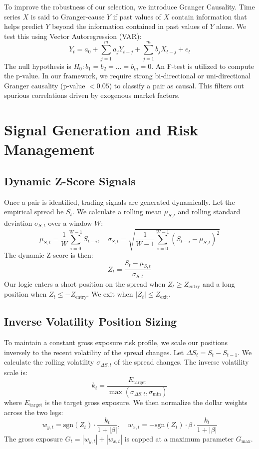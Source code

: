 \documentclass[12pt,a4paper]{article}
\begin{document}
To improve the robustness of our selection, we introduce Granger Causality. Time series $X$ is said to Granger-cause $Y$ if past values of $X$ contain information that helps predict $Y$ beyond the information contained in past values of $Y$ alone. We test this using Vector Autoregression (VAR):
\begin{equation}
    Y_t = a_0 + \sum_{j=1}^m a_j Y_{t-j} + \sum_{j=1}^m b_j X_{t-j} + e_t
\end{equation}
The null hypothesis is $H_0: b_1 = b_2 = \dots = b_m = 0$. An F-test is utilized to compute the p-value. In our framework, we require strong bi-directional or uni-directional Granger causality (p-value $< 0.05$) to classify a pair as causal. This filters out spurious correlations driven by exogenous market factors.

\section{Signal Generation and Risk Management}

\subsection{Dynamic Z-Score Signals}
Once a pair is identified, trading signals are generated dynamically. Let the empirical spread be $S_t$. We calculate a rolling mean $\mu_{S,t}$ and rolling standard deviation $\sigma_{S,t}$ over a window $W$:
\begin{equation}
    \mu_{S,t} = \frac{1}{W} \sum_{i=0}^{W-1} S_{t-i}, \quad \sigma_{S,t} = \sqrt{\frac{1}{W-1} \sum_{i=0}^{W-1} (S_{t-i} - \mu_{S,t})^2}
\end{equation}
The dynamic Z-score is then:
\begin{equation}
    Z_t = \frac{S_t - \mu_{S,t}}{\sigma_{S,t}}
\end{equation}
Our logic enters a short position on the spread when $Z_t \geq Z_{\text{entry}}$ and a long position when $Z_t \leq -Z_{\text{entry}}$. We exit when $|Z_t| \leq Z_{\text{exit}}$.

\subsection{Inverse Volatility Position Sizing}
To maintain a constant gross exposure risk profile, we scale our positions inversely to the recent volatility of the spread changes. Let $\Delta S_t = S_t - S_{t-1}$. We calculate the rolling volatility $\sigma_{\Delta S, t}$ of the spread changes.
The inverse volatility scale is:
\begin{equation}
    k_t = \frac{E_{\text{target}}}{\max(\sigma_{\Delta S, t}, \sigma_{\text{min}})}
\end{equation}
where $E_{\text{target}}$ is the target gross exposure. We then normalize the dollar weights across the two legs:
\begin{equation}
    w_{y,t} = \text{sgn}(Z_t) \cdot \frac{k_t}{1 + |\beta|}, \quad w_{x,t} = -\text{sgn}(Z_t) \cdot \beta \cdot \frac{k_t}{1 + |\beta|}
\end{equation}
The gross exposure $G_t = |w_{y,t}| + |w_{x,t}|$ is capped at a maximum parameter $G_{\text{max}}$.
\end{document}
